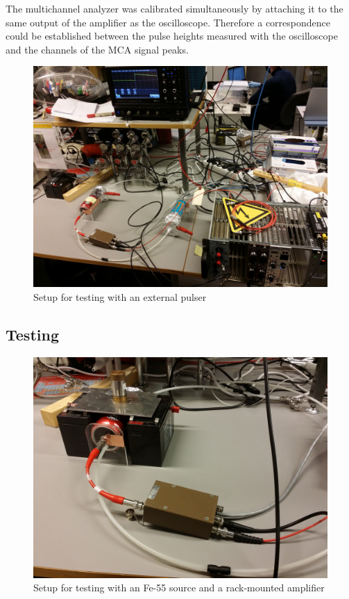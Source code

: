\documentclass[a4paper]{article}
\begin{document}
The multichannel analyzer was calibrated simultaneously by attaching it to the same output of the amplifier as the oscilloscope.
Therefore a correspondence could be established between the pulse heights measured with the oscilloscope and the channels of the MCA signal peaks. 





\begin{figure}[ht!]
\centering
\includegraphics[width=\textwidth]{fig/IMG_20201130_135000.jpg}
\caption{Setup for testing with an external pulser}
\end{figure}


\FloatBarrier
\subsection{Testing}
\label{setup_testing}

\begin{figure}[ht!]
\centering
\includegraphics[width=\textwidth]{fig/IMG_20201130_144418.jpg}
\caption{Setup for testing with an Fe-55 source and a rack-mounted amplifier}
\end{figure}
\end{document}
